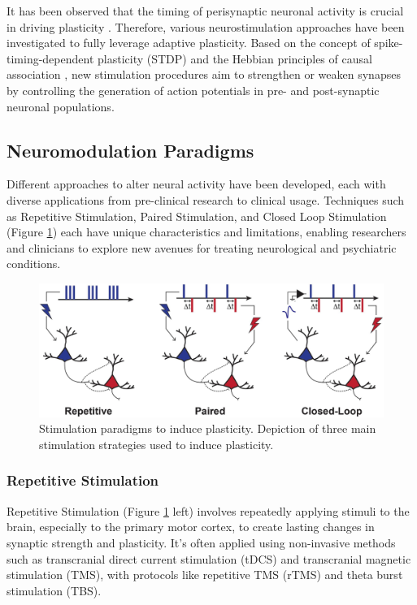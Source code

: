 It has been observed that the timing of perisynaptic neuronal activity is crucial in driving plasticity \cite{Feldman2012}. Therefore, various neurostimulation approaches have been investigated to fully leverage adaptive plasticity. Based on the concept of spike-timing-dependent plasticity (STDP) and the Hebbian principles of causal association \cite{Hebb1949}, new stimulation procedures aim to strengthen or weaken synapses by controlling the generation of action potentials in pre- and post-synaptic neuronal populations.

\subsection{Neuromodulation Paradigms}

Different approaches to alter neural activity have been developed, each with diverse applications from pre-clinical research to clinical usage. Techniques such as Repetitive Stimulation, Paired Stimulation, and Closed Loop Stimulation (Figure \ref{fig:Neuromodulation Paradigms}) each have unique characteristics and limitations, enabling researchers and clinicians to explore new avenues for treating neurological and psychiatric conditions.

\begin{figure}[ht!]
    \begin{center}
    \includegraphics[width=0.9\linewidth]{Figure/Neuromodulation Paradigms.jpg}
    \end{center}
    \caption{\protect\cite{Ting2021} Stimulation paradigms to induce plasticity. Depiction of three main stimulation strategies used to induce plasticity.}
    \label{fig:Neuromodulation Paradigms}
\end{figure}

\subsubsection{Repetitive Stimulation}

Repetitive Stimulation (Figure \ref{fig:Neuromodulation Paradigms} left) involves repeatedly applying stimuli to the brain, especially to the primary motor cortex, to create lasting changes in synaptic strength and plasticity. It's often applied using non-invasive methods such as transcranial direct current stimulation (tDCS) and transcranial magnetic stimulation (TMS), with protocols like repetitive TMS (rTMS) and theta burst stimulation (TBS).

